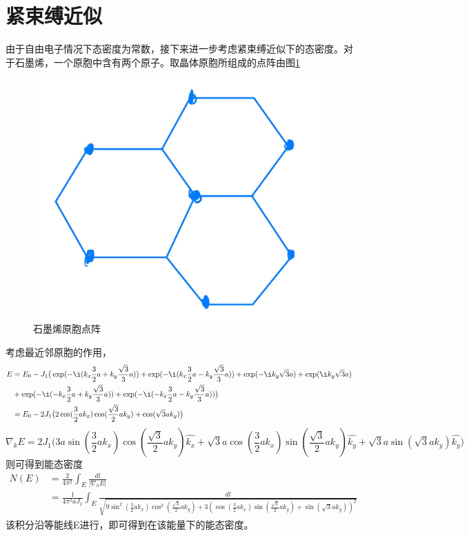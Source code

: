 \documentclass{article}
\begin{document}
\section{紧束缚近似}
由于自由电子情况下态密度为常数，接下来进一步考虑紧束缚近似下的态密度。对于石墨烯，一个原胞中含有两个原子。取晶体原胞所组成的点阵由图\ref{fig:3}
	\begin{figure}[!h]
	
	\centering
	\includegraphics[scale=0.2]{原胞点阵}
	\caption{\heiti{}石墨烯原胞点阵}
	\label{fig:3}
\end{figure}

考虑最近邻原胞的作用，
\begin{equation}
	\begin{aligned}
	E&=E_0-J_1\big(\exp(-\i(k_x\frac{3}{2}a+k_y\frac{\sqrt{3}}{3}a))+\exp(-\i(k_x\frac{3}{2}a-k_y\frac{\sqrt{3}}{3}a))+\exp(-\i k_y\sqrt{3}a)+\exp(\i k_y\sqrt{3}a)\\
	&+\exp(-\i(-k_x\frac{3}{2}a+k_y\frac{\sqrt{3}}{3}a))+\exp(-\i(-k_x\frac{3}{2}a-k_y\frac{\sqrt{3}}{3}a))\big)\\
	&=E_0-2J_1\big(2\cos(\frac{3}{2}ak_x)\cos(\frac{\sqrt{3}}{2}ak_y)+\cos(\sqrt{3}ak_y)\big)
	\end{aligned}
\end{equation}
\begin{equation}
	\nabla_kE=2J_1\big(3a\sin(\frac{3}{2}ak_x)\cos(\frac{\sqrt{3}}{2}ak_y)\hat{k_x}+\sqrt{3}a\cos(\frac{3}{2}ak_x)\sin(\frac{\sqrt{3}}{2}ak_y)\hat{k_y}+\sqrt{3}a\sin(\sqrt{3}ak_y)\hat{k_y}\big)
\end{equation}
则可得到能态密度
\begin{equation}
	\begin{aligned}
		N(E)&=\frac{2}{4\pi^2}\int_{E}\frac{dl}{|\nabla_kE|}\\
		&=\frac{1}{4\pi^2aJ_1}\int_{E}\frac{dl}{\sqrt{9\sin^2(\frac{3}{2}ak_x)\cos^2(\frac{\sqrt{3}}{2}ak_y)+3(\cos(\frac{3}{2}ak_x)\sin(\frac{\sqrt{3}}{2}ak_y)+\sin(\sqrt{3}ak_y))^2}}
	\end{aligned}
\end{equation}
该积分沿等能线E进行，即可得到在该能量下的能态密度。
\end{document}
